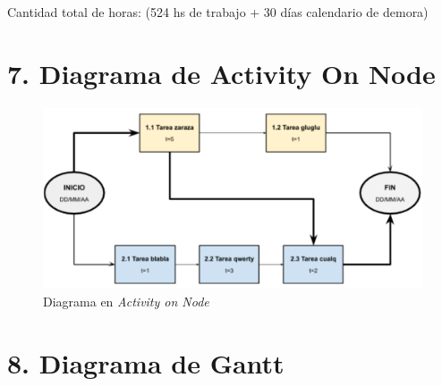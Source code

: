 \documentclass[11pt]{charter}
\begin{document}
Cantidad total de horas: (524 hs de trabajo + 30 días calendario de demora)


\section{7. Diagrama de Activity On Node}
\label{sec:AoN}

\begin{figure}[htpb]
\centering 
\includegraphics[width=.8\textwidth]{./Figuras/AoN.png}
\caption{Diagrama en \textit{Activity on Node}}
\label{fig:AoN}
\end{figure}


\section{8. Diagrama de Gantt}
\label{sec:gantt}
\end{document}
